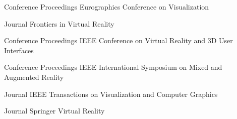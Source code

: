 \begin{cventries}
  \cventry
    {Conference Proceedings} %
    {Eurographics Conference on Visualization} %
    {} %
    {} %
    {}
    \vspace{-0.15in}
    
  \cventry
    {Journal} %
    {Frontiers in Virtual Reality} %
    {} %
    {} %
    {}
    \vspace{-0.15in}
    
  \cventry
    {Conference Proceedings} %
    {IEEE Conference on Virtual Reality and 3D User Interfaces} %
    {} %
    {} %
    {}
    \vspace{-0.15in}
    
  \cventry
    {Conference Proceedings} %
    {IEEE International Symposium on Mixed and Augmented Reality} %
    {} %
    {} %
    {}
    \vspace{-0.15in}
    
  \cventry
    {Journal} %
    {IEEE Transactions on Visualization and Computer Graphics} %
    {} %
    {} %
    {}
    \vspace{-0.15in}

  \cventry
    {Journal} %
    {Springer Virtual Reality} %
    {} %
    {} %
    {}
    \vspace{-0.15in}

  
\end{cventries}
